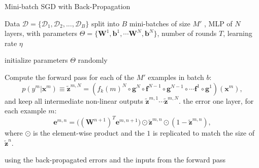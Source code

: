 \begin{algorithm}[th!]
\label{algo:backprop}

   \caption{Mini-batch SGD with Back-Propagation \label{alg:maxent_gd}}

\begin{algorithmic}[1]

Data $\mathcal{D}=\{\mathcal{D}_1,\mathcal{D}_2,...,\mathcal{D}_B\}$ split into $B$ mini-batches of size $M'$%
, MLP of $N$ layers, with parameters $\Theta=\{\mathbf{W}^1, \mathbf{b}^1, \cdots \mathbf{W}^N, \mathbf{b}^N\}$, number of rounds $T$, learning rate $\eta$

   \STATE initialize parameters $\Theta$ randomly 


	\vspace{0.3cm}
	\STATE Compute the {forward pass} for each of the $M'$ examples in batch $b$:
    $$p(y^m|\mathbf{x}^m) \equiv \tilde{\mathbf{z}}^{m,N} = (f_k(m)^N \circ \mathbf{g}^N \circ \mathbf{f}^{N-1} \circ \mathbf{g}^{N-1} \circ \cdots \mathbf{f}^1 \circ \mathbf{g}^1)(\mathbf{x}^m),$$
	 and keep all intermediate non-linear outputs $\tilde{\mathbf{z}}^{m,1} \cdots \tilde{\mathbf{z}}^{m,N}$.
	\ENDFOR	
	\vspace{0.3cm}
		\ENDFOR	
        \ELSE
		 the error one layer, for each example $m$:  
        $$\mathbf{e}^{m,n} = \Big((\mathbf{W}^{n+1})^T \mathbf{e}^{m,n+1}\Big) \odot \tilde{\mathbf{z}}^{m,n} \odot (\mathbf{\mathrm{1}}-\tilde{\mathbf{z}}^{m,n}),$$
        where $\odot$ is the element-wise product and the $\mathbf{\mathrm{1}}$ is replicated to match the size of $\tilde{\mathbf{z}}^n$.
		\ENDFOR	
        \ENDIF 

		\vspace{0.3cm}
         using the back-propagated errors and the inputs from the forward pass


\end{algorithmic}
\end{algorithm}
